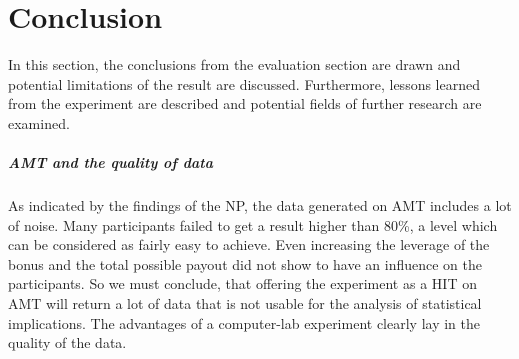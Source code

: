 
\chapter{Conclusion}
\label{ch:Conclusion}

In this section, the conclusions from the evaluation section are drawn and potential limitations of the result are discussed. Furthermore, lessons learned from the experiment are described and potential fields of further research are examined.


\paragraph{\acf{AMT} and the quality of data}
As indicated by the findings of the \acl{NP}, the data generated on \ac{AMT} includes a lot of noise. Many participants failed to get a result higher than 80\%, a level which can be considered as fairly easy to achieve. Even increasing the leverage of the bonus and the total possible payout did not show to have an influence on the participants. So we must conclude, that offering the experiment as a \ac{HIT} on \ac{AMT} will return a lot of data that is not usable for the analysis of statistical implications. The advantages of a computer-lab experiment clearly lay in the quality of the data.

